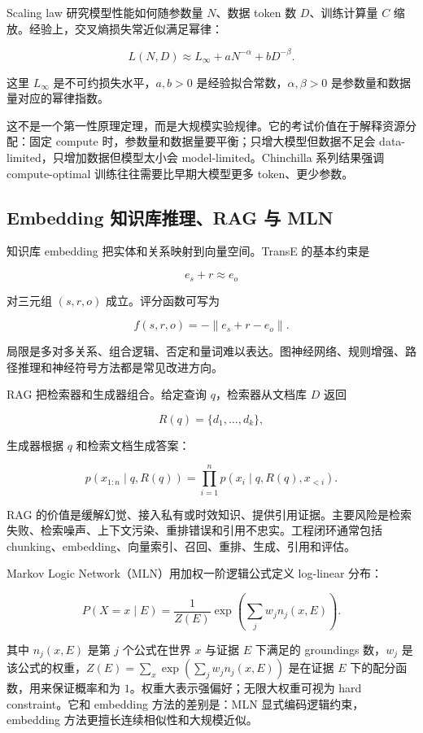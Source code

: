 \documentclass[11pt]{ctexart}
\begin{document}

Scaling law 研究模型性能如何随参数量 \(N\)、数据 token 数 \(D\)、训练计算量 \(C\) 缩放。经验上，交叉熵损失常近似满足幂律：

\[
  L(N,D)
  \approx
  L_\infty
  +
  aN^{-\alpha}
  +
  bD^{-\beta}.
\]

这里 \(L_\infty\) 是不可约损失水平，\(a,b>0\) 是经验拟合常数，\(\alpha,\beta>0\) 是参数量和数据量对应的幂律指数。

这不是一个第一性原理定理，而是大规模实验规律。它的考试价值在于解释资源分配：固定 compute 时，参数量和数据量要平衡；只增大模型但数据不足会 data-limited，只增加数据但模型太小会 model-limited。Chinchilla 系列结果强调 compute-optimal 训练往往需要比早期大模型更多 token、更少参数。

\subsection{Embedding 知识库推理、RAG 与 MLN}


知识库 embedding 把实体和关系映射到向量空间。TransE 的基本约束是

\[
  e_s+r\approx e_o
\]

对三元组 \((s,r,o)\) 成立。评分函数可写为

\[
  f(s,r,o)=-\|e_s+r-e_o\|.
\]

局限是多对多关系、组合逻辑、否定和量词难以表达。图神经网络、规则增强、路径推理和神经符号方法都是常见改进方向。

RAG 把检索器和生成器组合。给定查询 \(q\)，检索器从文档库 \(D\) 返回

\[
  R(q)=\{d_1,\ldots,d_k\},
\]

生成器根据 \(q\) 和检索文档生成答案：

\[
  p(x_{1:n}\mid q,R(q))
  =
  \prod_{i=1}^{n}
  p(x_i\mid q,R(q),x_{<i}).
\]

RAG 的价值是缓解幻觉、接入私有或时效知识、提供引用证据。主要风险是检索失败、检索噪声、上下文污染、重排错误和引用不忠实。工程闭环通常包括 chunking、embedding、向量索引、召回、重排、生成、引用和评估。

Markov Logic Network（MLN）用加权一阶逻辑公式定义 log-linear 分布：

\[
  P(X=x\mid E)
  =
  \frac{1}{Z(E)}
  \exp
  \left(
    \sum_j w_j n_j(x,E)
  \right).
\]

其中 \(n_j(x,E)\) 是第 \(j\) 个公式在世界 \(x\) 与证据 \(E\) 下满足的 groundings 数，\(w_j\) 是该公式的权重，\(Z(E)=\sum_x \exp(\sum_j w_j n_j(x,E))\) 是在证据 \(E\) 下的配分函数，用来保证概率和为 \(1\)。权重大表示强偏好；无限大权重可视为 hard constraint。它和 embedding 方法的差别是：MLN 显式编码逻辑约束，embedding 方法更擅长连续相似性和大规模近似。
\end{document}
